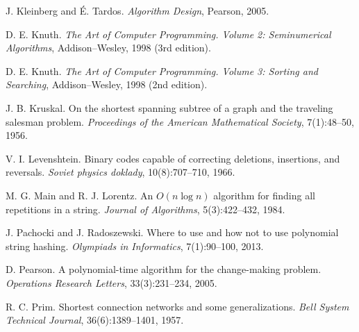 \begin{thebibliography}{9}
  J. Kleinberg and É. Tardos.
  \emph{Algorithm Design}, Pearson, 2005.


  D. E. Knuth.
  \emph{The Art of Computer Programming. Volume 2: Seminumerical Algorithms}, Addison–Wesley, 1998 (3rd edition).

  D. E. Knuth.
  \emph{The Art of Computer Programming. Volume 3: Sorting and Searching}, Addison–Wesley, 1998 (2nd edition).


  J. B. Kruskal.
  On the shortest spanning subtree of a graph and the traveling salesman problem.
  \emph{Proceedings of the American Mathematical Society}, 7(1):48--50, 1956.

  V. I. Levenshtein.
  Binary codes capable of correcting deletions, insertions, and reversals.
  \emph{Soviet physics doklady}, 10(8):707--710, 1966.

  M. G. Main and R. J. Lorentz.
  An $O(n \log n)$ algorithm for finding all repetitions in a string.
  \emph{Journal of Algorithms}, 5(3):422--432, 1984.


  J. Pachocki and J. Radoszewski.
  Where to use and how not to use polynomial string hashing.
  \emph{Olympiads in Informatics}, 7(1):90--100, 2013.


  D. Pearson.
  A polynomial-time algorithm for the change-making problem.
  \emph{Operations Research Letters}, 33(3):231--234, 2005.

  R. C. Prim.
  Shortest connection networks and some generalizations.
  \emph{Bell System Technical Journal}, 36(6):1389--1401, 1957.



\end{thebibliography}
